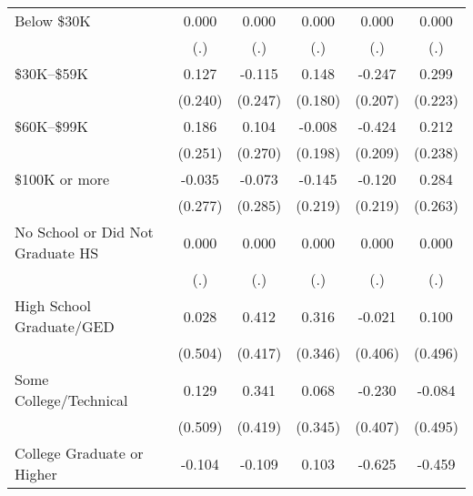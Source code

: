 \begin{table}[htbp]
\begin{tabular}{l*{5}{c}}
Below \$30K         &       0.000         &       0.000         &       0.000         &       0.000         &       0.000         \\
                    &         (.)         &         (.)         &         (.)         &         (.)         &         (.)         \\
\$30K--\$59K        &       0.127         &      -0.115         &       0.148         &      -0.247         &       0.299         \\
                    &     (0.240)         &     (0.247)         &     (0.180)         &     (0.207)         &     (0.223)         \\
\$60K--\$99K        &       0.186         &       0.104         &      -0.008         &      -0.424\sym{**} &       0.212         \\
                    &     (0.251)         &     (0.270)         &     (0.198)         &     (0.209)         &     (0.238)         \\
\$100K or more      &      -0.035         &      -0.073         &      -0.145         &      -0.120         &       0.284         \\
                    &     (0.277)         &     (0.285)         &     (0.219)         &     (0.219)         &     (0.263)         \\
No School or Did Not Graduate HS&       0.000         &       0.000         &       0.000         &       0.000         &       0.000         \\
                    &         (.)         &         (.)         &         (.)         &         (.)         &         (.)         \\
High School Graduate/GED&       0.028         &       0.412         &       0.316         &      -0.021         &       0.100         \\
                    &     (0.504)         &     (0.417)         &     (0.346)         &     (0.406)         &     (0.496)         \\
Some College/Technical&       0.129         &       0.341         &       0.068         &      -0.230         &      -0.084         \\
                    &     (0.509)         &     (0.419)         &     (0.345)         &     (0.407)         &     (0.495)         \\
College Graduate or Higher&      -0.104         &      -0.109         &       0.103         &      -0.625         &      -0.459         \\

\end{tabular}
\end{table}
